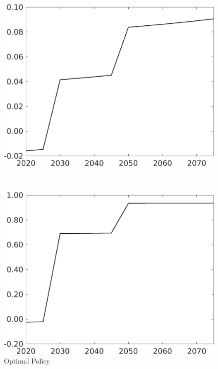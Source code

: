 \begin{figure}[h!!]
	\centering
	\caption{Optimal Policy }\label{fig:optPol}
	\begin{minipage}[]{0.4\textwidth}
		\includegraphics[width=1\textwidth]{../../codding_model/own_basedOnFried/optimalPol_elastS_DisuSci/figures/all_1705/Single_OPT_T_NoTaus_taul_spillover0_sep1_BN0_ineq0_red0_etaa0.79.png}
	\end{minipage}
	\begin{minipage}[]{0.1\textwidth}
		\
	\end{minipage}
	\begin{minipage}[]{0.4\textwidth}
		\includegraphics[width=1\textwidth]{../../codding_model/own_basedOnFried/optimalPol_elastS_DisuSci/figures/all_1705/Single_OPT_T_NoTaus_tauf_spillover0_sep1_BN0_ineq0_red0_etaa0.79.png}
	\end{minipage}
\end{figure} 

